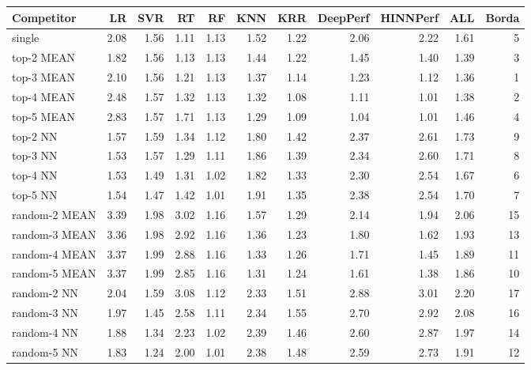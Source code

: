 \begin{tabular}{lrrrrrrrrrr}
\toprule
Competitor & LR & SVR & RT & RF & KNN & KRR & DeepPerf & HINNPerf & ALL & Borda \\
\midrule
single & 2.08 & 1.56 & 1.11 & 1.13 & 1.52 & 1.22 & 2.06 & 2.22 & 1.61 & 5 \\
top-2 MEAN & 1.82 & 1.56 & 1.13 & 1.13 & 1.44 & 1.22 & 1.45 & 1.40 & 1.39 & 3 \\
top-3 MEAN & 2.10 & 1.56 & 1.21 & 1.13 & 1.37 & 1.14 & 1.23 & 1.12 & 1.36 & 1 \\
top-4 MEAN & 2.48 & 1.57 & 1.32 & 1.13 & 1.32 & 1.08 & 1.11 & 1.01 & 1.38 & 2 \\
top-5 MEAN & 2.83 & 1.57 & 1.71 & 1.13 & 1.29 & 1.09 & 1.04 & 1.01 & 1.46 & 4 \\
top-2 NN & 1.57 & 1.59 & 1.34 & 1.12 & 1.80 & 1.42 & 2.37 & 2.61 & 1.73 & 9 \\
top-3 NN & 1.53 & 1.57 & 1.29 & 1.11 & 1.86 & 1.39 & 2.34 & 2.60 & 1.71 & 8 \\
top-4 NN & 1.53 & 1.49 & 1.31 & 1.02 & 1.82 & 1.33 & 2.30 & 2.54 & 1.67 & 6 \\
top-5 NN & 1.54 & 1.47 & 1.42 & 1.01 & 1.91 & 1.35 & 2.38 & 2.54 & 1.70 & 7 \\
random-2 MEAN & 3.39 & 1.98 & 3.02 & 1.16 & 1.57 & 1.29 & 2.14 & 1.94 & 2.06 & 15 \\
random-3 MEAN & 3.36 & 1.98 & 2.92 & 1.16 & 1.36 & 1.23 & 1.80 & 1.62 & 1.93 & 13 \\
random-4 MEAN & 3.37 & 1.99 & 2.88 & 1.16 & 1.33 & 1.26 & 1.71 & 1.45 & 1.89 & 11 \\
random-5 MEAN & 3.37 & 1.99 & 2.85 & 1.16 & 1.31 & 1.24 & 1.61 & 1.38 & 1.86 & 10 \\
random-2 NN & 2.04 & 1.59 & 3.08 & 1.12 & 2.33 & 1.51 & 2.88 & 3.01 & 2.20 & 17 \\
random-3 NN & 1.97 & 1.45 & 2.58 & 1.11 & 2.34 & 1.55 & 2.70 & 2.92 & 2.08 & 16 \\
random-4 NN & 1.88 & 1.34 & 2.23 & 1.02 & 2.39 & 1.46 & 2.60 & 2.87 & 1.97 & 14 \\
random-5 NN & 1.83 & 1.24 & 2.00 & 1.01 & 2.38 & 1.48 & 2.59 & 2.73 & 1.91 & 12 \\
\bottomrule
\end{tabular}

